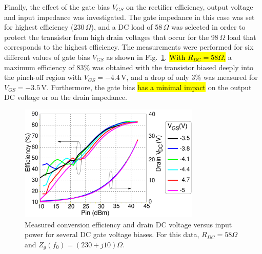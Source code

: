 
Finally, the effect of the gate bias $V_{GS}$ on the rectifier efficiency, output voltage and input impedance was investigated. The gate impedance in this case was set for highest efficiency (230\,$\Omega$), and a DC load of 58\,$\Omega$ was selected in order to protect the transistor from high drain voltages that occur for the 98\,$\Omega$ load that corresponds to the highest efficiency. The measurements were performed for six different values of gate bias $V_{GS}$ as shown in Fig.~\ref{VG_sweep_final}. \hl{With $R_{DC}=58\Omega$,} a maximum efficiency of 83\% was obtained with the transistor biased deeply into the pinch-off region with $V_{GS}=-4.4$\,V, and a drop of only  3\% was measured for $V_{GS}=-3.5$\,V. Furthermore, the gate bias \hl{has a minimal impact} on the output DC voltage or on the drain impedance.


\begin{figure}[ht!]
\centering
\includegraphics[width=3.4in]{pdf/15.pdf}
\caption{Measured conversion efficiency and drain DC voltage versus input power for several DC gate voltage biases. For this data, $R_{DC}=58\Omega$ and $Z_g(f_0)=\left(230+j10\right)\Omega$.}
\label{VG_sweep_final}
\end{figure}







